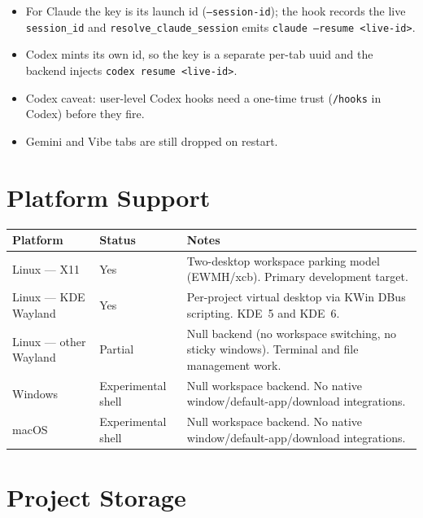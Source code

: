 \documentclass[11pt,a4paper]{article}
\newcommand{\code}[1]{\texttt{#1}}
\begin{document}
\begin{itemize}
  \item For Claude the key is its launch id (\code{--session-id}); the hook
  records the live \code{session\_id} and \code{resolve\_claude\_session} emits
  \code{claude --resume <live-id>}.
  \item Codex mints its own id, so the key is a separate per-tab uuid and the
  backend injects \code{codex resume <live-id>}.
  \item Codex caveat: user-level Codex hooks need a one-time trust (\code{/hooks}
  in Codex) before they fire.
  \item Gemini and Vibe tabs are still dropped on restart.
\end{itemize}

\section{Platform Support}

\begin{longtable}{@{}p{4.6cm}p{3.4cm}p{6.4cm}@{}}
\toprule
\textbf{Platform} & \textbf{Status} & \textbf{Notes} \\
\midrule
\endhead
Linux --- X11          & Yes                 & Two-desktop workspace parking model (EWMH/xcb). Primary development target. \\
Linux --- KDE Wayland  & Yes                 & Per-project virtual desktop via KWin DBus scripting. KDE~5 and KDE~6. \\
Linux --- other Wayland& Partial             & Null backend (no workspace switching, no sticky windows). Terminal and file management work. \\
Windows                & Experimental shell  & Null workspace backend. No native window/default-app/download integrations. \\
macOS                  & Experimental shell  & Null workspace backend. No native window/default-app/download integrations. \\
\bottomrule
\end{longtable}

\section{Project Storage}
\end{document}
